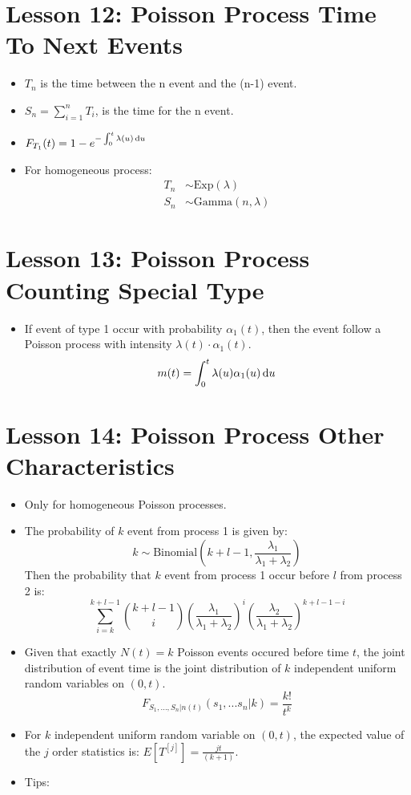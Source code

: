 \documentclass[10pt, french]{article}
\begin{document}
\begin{multicols*}{3}
\section*{Lesson 12: Poisson Process Time To Next Events}
\begin{itemize}[align=left,leftmargin=*]
    \item $T_n$ is the time between the n event and the (n-1) event.
    \item $S_n = \sum_{i=1}^n T_i$, is the time for the n event.
    \item $F_{T_1}(t)=1-e^{-\int_0^t \lambda(u) \mathop{}\!\mathrm{d}{u}}$
    \item For homogeneous process:
    \begin{align*}
        T_n &\sim \mathrm{Exp}(\lambda) \\
        S_n &\sim \mathrm{Gamma}(n, \lambda)
    \end{align*}
\end{itemize}

\section*{Lesson 13: Poisson Process Counting Special Type}
\label{Lesson 13}
\begin{itemize}[align=left,leftmargin=*]
    \item If event of type 1 occur with probability $\alpha_1(t)$, then the event follow a Poisson process with intensity $\lambda(t) \cdot  \alpha_1(t)$. \[ m(t)=\int_0^t \lambda(u)\alpha_1(u) \mathop{}\!\mathrm{d}{u} \]
\end{itemize}

\section*{Lesson 14: Poisson Process Other Characteristics}
\begin{itemize}[align=left,leftmargin=*]
    \item Only for homogeneous Poisson processes.
    \item The probability of $k$ event from process 1 is given by: \[ k \sim \mathrm{Binomial}\left( k+l-1, \frac{\lambda_1}{\lambda_1 + \lambda_2} \right) \] Then the probability that $k$ event from process 1 occur before $l$ from process 2 is: \[ \sum_{i=k}^{k+l-1} \binom{k+l-1}{i} \left( \frac{\lambda_1}{\lambda_1+\lambda_2} \right)^i \left(\frac{\lambda_2}{\lambda_1+\lambda_2}\right)^{k+l-1-i} \]
    \item Given that exactly $N(t) = k$ Poisson events occured before time $t$, the joint distribution of event time is the joint distribution of $k$ independent uniform random variables on $(0, t)$. \[ F_{S_1,...,S_n|n(t)}(s_1,...s_n|k) = \frac{k!}{t^k} \]
    \item For $k$ independent uniform random variable on $(0, t)$, the expected value of the $j$ order statistics is: $E[T^{[j]}] =  \frac{jt}{(k+1)} $.
    \item Tips: {\color{AppendixColor}}
\end{itemize}


\end{multicols*}
\end{document}
